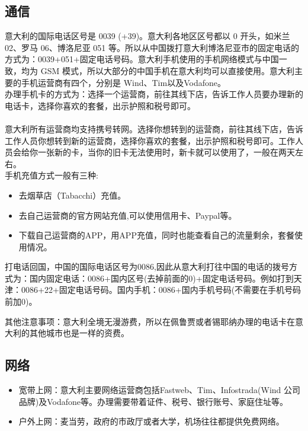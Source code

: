 \subsection{通信}
意大利的国际电话区号是 0039 (+39)。意大利各地区区号都以 0 开头，如米兰 02、罗马 06、博洛尼亚 051 等。所以从中国拨打意大利博洛尼亚市的固定电话的方式为：0039+051+固定电话号码。意大利手机使用的手机网络模式与中国一致，均为 GSM 模式，所以大部分的中国手机在意大利均可以直接使用。意大利主要的手机运营商有四个，分别是 Wind、Tim以及Vodafone。 \\
办理手机卡的方式为：选择一个运营商，前往其线下店，告诉工作人员要办理新的电话卡，选择你喜欢的套餐，出示护照和税号即可。\\
\\
意大利所有运营商均支持携号转网。选择你想转到的运营商，前往其线下店，告诉工作人员你想转到新的运营商，选择你喜欢的套餐，出示护照和税号即可。工作人员会给你一张新的卡，当你的旧卡无法使用时，新卡就可以使用了，一般在两天左右。\\



手机充值方式一般有三种:
\begin{itemize}
\item 去烟草店（Tabacchi）充值。 
\item 去自己运营商的官方网站充值,可以使用信用卡、Paypal等。 
\item 下载自己运营商的APP，用APP充值，同时也能查看自己的流量剩余，套餐使用情况。
\end{itemize}
打电话回国，中国的国际电话区号为0086,因此从意大利打往中国的电话的拨号方式为：国内固定电话：0086+国内区号(去掉前面的0)+固定电话号码。例如打到天津：0086+22+固定电话号码。国内手机：0086+国内手机号码(不需要在手机号码前加0)。

其他注意事项：意大利全境无漫游费，所以在佩鲁贾或者锡耶纳办理的电话卡在意大利的其他城市也是一样的资费。 
\subsection{网络}

\begin{itemize}
\item 宽带上网：意大利主要网络运营商包括Fastweb、Tim、Infostrada(Wind 公司品牌)及Vodafone等。办理需要带着证件、税号、银行账号、家庭住址等。
\item 户外上网：麦当劳，政府的市政厅或者大学，机场往往都提供免费网络。
\end{itemize}
